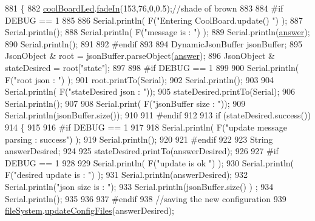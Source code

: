 \begin{DoxyCode}
881 \{
882     \hyperlink{class_cool_board_a1b1d3c684a5baa56b08486e192fd8e97}{coolBoardLed}.\hyperlink{class_cool_board_led_ab778f5e7bed0ab74e3906d82110493c3}{fadeIn}(153,76,0,0.5);\textcolor{comment}{//shade of brown        }
883 
884 \textcolor{preprocessor}{#if DEBUG == 1}
885 
886     Serial.println( F(\textcolor{stringliteral}{"Entering CoolBoard.update() "}) );
887     Serial.println();
888     Serial.println( F(\textcolor{stringliteral}{"message is : "}) );
889     Serial.println(\hyperlink{class_cool_board_a7b835fafd449e5282f7f91d787a2dc15}{answer});
890     Serial.println();
891 
892 \textcolor{preprocessor}{#endif}
893 
894     DynamicJsonBuffer jsonBuffer;
895     JsonObject & root = jsonBuffer.parseObject(\hyperlink{class_cool_board_a7b835fafd449e5282f7f91d787a2dc15}{answer});
896     JsonObject & stateDesired = root[\textcolor{stringliteral}{"state"}];
897 
898 \textcolor{preprocessor}{#if DEBUG == 1}
899 
900     Serial.println( F(\textcolor{stringliteral}{"root json : "}) );
901     root.printTo(Serial);
902     Serial.println();
903 
904     Serial.println( F(\textcolor{stringliteral}{"stateDesired json : "}));
905     stateDesired.printTo(Serial);
906     Serial.println();
907     
908     Serial.print( F(\textcolor{stringliteral}{"jsonBuffer size : "}));
909     Serial.println(jsonBuffer.size());
910 
911 \textcolor{preprocessor}{#endif}
912 
913     \textcolor{keywordflow}{if} (stateDesired.success())
914     \{
915     
916 \textcolor{preprocessor}{    #if DEBUG == 1}
917 
918         Serial.println( F(\textcolor{stringliteral}{"update message parsing : success"}) );
919         Serial.println();
920     
921 \textcolor{preprocessor}{    #endif}
922 
923             String answerDesired;
924         
925             stateDesired.printTo(answerDesired);
926             
927 \textcolor{preprocessor}{        #if DEBUG == 1      }
928         
929             Serial.println( F(\textcolor{stringliteral}{"update is ok "}) );
930             Serial.println( F(\textcolor{stringliteral}{"desired update is : "}) );            
931             Serial.println(answerDesired);
932             Serial.println(\textcolor{stringliteral}{"json size is : "});
933             Serial.println(jsonBuffer.size() ) ;                
934             Serial.println();
935 
936         
937 \textcolor{preprocessor}{        #endif}
938             \textcolor{comment}{//saving the new configuration}
939             \hyperlink{class_cool_board_a42c2586fbb13ff7f06538e9284e8538d}{fileSystem}.\hyperlink{class_cool_file_system_adfa8e2e80641ae6f0cceabd348a9b841}{updateConfigFiles}(answerDesired);

\end{DoxyCode}

